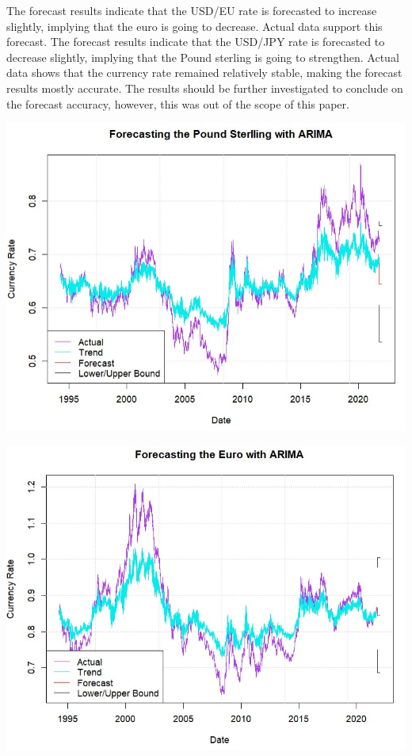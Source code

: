 \documentclass[11pt,preprint, authoryear]{elsarticle}
\let\origfigure\figure
\let\endorigfigure\endfigure
\renewenvironment{figure}[1][2] {
    \expandafter\origfigure\expandafter[H]
} {
    \endorigfigure
}
\numberwithin{equation}{section}
\numberwithin{figure}{section}
\numberwithin{table}{section}
\begin{document}
The forecast results indicate that the USD/EU rate is forecasted to
increase slightly, implying that the euro is going to decrease. Actual
data support this forecast. The forecast results indicate that the
USD/JPY rate is forecasted to decrease slightly, implying that the Pound
sterling is going to strengthen. Actual data shows that the currency
rate remained relatively stable, making the forecast results mostly
accurate. The results should be further investigated to conclude on the
forecast accuracy, however, this was out of the scope of this paper.

\begin{figure}
\centering 
\begin{minipage}[t]{8.2cm} 
\centering 
 \includegraphics[width=\linewidth]{fore1.jpg} 
 \end{minipage} 
 \hspace{0.1cm} 
 \begin{minipage}[t]{8.2cm} 
 \centering 
 \includegraphics[width=\linewidth]{fore2.jpg} 
 \end{minipage}
\caption{Forecasting Results (1)}
\label{for1}
\end{figure}
\end{document}
